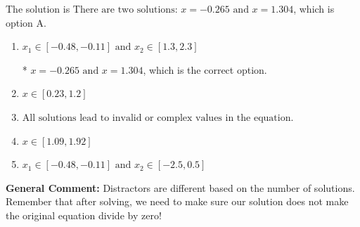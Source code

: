 \documentclass{extbook}[14pt]
\begin{document}
\begin{enumerate}
{The solution is \( \text{There are two solutions: } x = -0.265 \text{ and } x = 1.304 \), which is option A.\begin{enumerate}[label=\Alph*.]
\item \( x_1 \in [-0.48, -0.11] \text{ and } x_2 \in [1.3,2.3] \)

* $x = -0.265 \text{ and } x = 1.304$, which is the correct option.
\item \( x \in [0.23,1.2] \)


\item \( \text{All solutions lead to invalid or complex values in the equation.} \)


\item \( x \in [1.09,1.92] \)


\item \( x_1 \in [-0.48, -0.11] \text{ and } x_2 \in [-2.5,0.5] \)


\end{enumerate}

\textbf{General Comment:} Distractors are different based on the number of solutions. Remember that after solving, we need to make sure our solution does not make the original equation divide by zero!
}
\end{enumerate}
\end{document}
